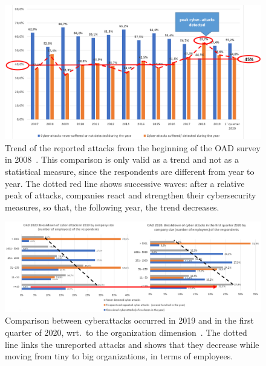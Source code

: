 \documentclass{easychair}
\begin{document}
\begin{figure}
  \centering
  \includegraphics[width=1\textwidth]{pictures/fig2.png}
  \caption{Trend of the reported attacks from the beginning of the OAD survey
    in 2008~\cite{oad20}. This comparison is only valid as a trend and not as a statistical
    measure, since the respondents are different from year to year. The dotted red line shows
    successive waves: after a relative peak of attacks, companies react and strengthen
    their cybersecurity measures, so that, the following year, the trend decreases.}
  \label{fig:2}
\end{figure}

\begin{figure}
	\begin{center}
		\includegraphics[scale=0.52]{pictures/fig3.png}
	\end{center}
  \caption{Comparison between cyberattacks occurred in 2019 and in the first quarter of 2020,
    wrt.\ to the organization dimension~\cite{oad20}. The dotted line links
    the unreported attacks and shows that they decrease while moving from tiny to big organizations,
    in terms of employees.}
  \label{fig:3}
\end{figure}
\end{document}

